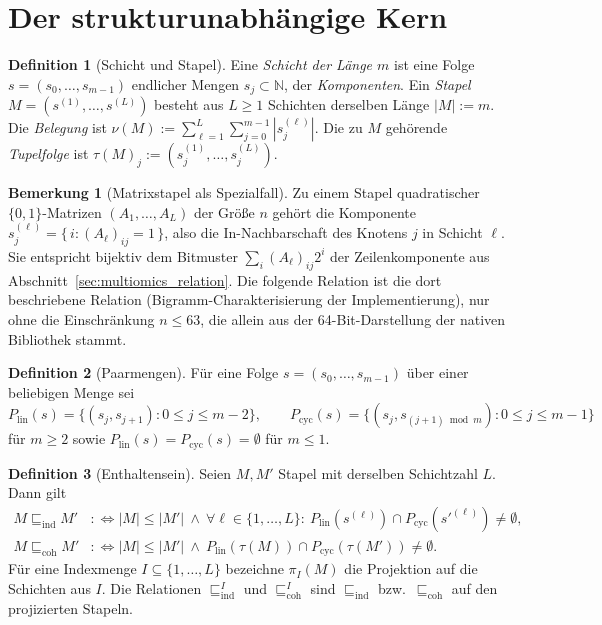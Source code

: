 \documentclass[a4paper,12pt, twoside]{report}
\theoremstyle{definition}
\newtheorem{definition}{Definition}
\newtheorem{bemerkung}{Bemerkung}
\begin{document}
\section{Der strukturunabhängige Kern}
\label{sec:univ_kern}

\begin{definition}[Schicht und Stapel]
	Eine \emph{Schicht der Länge $m$} ist eine Folge $s=(s_0,\dots,s_{m-1})$ endlicher Mengen $s_j\subset\mathbb{N}$, der \emph{Komponenten}. Ein \emph{Stapel} $M=(s^{(1)},\dots,s^{(L)})$ besteht aus $L\ge 1$ Schichten derselben Länge $|M|:=m$. Die \emph{Belegung} ist $\nu(M):=\sum_{\ell=1}^{L}\sum_{j=0}^{m-1}|s^{(\ell)}_j|$. Die zu $M$ gehörende \emph{Tupelfolge} ist $\tau(M)_j:=(s^{(1)}_j,\dots,s^{(L)}_j)$.
\end{definition}

\begin{bemerkung}[Matrixstapel als Spezialfall]
	\label{bem:univ_matrix}
	Zu einem Stapel quadratischer $\{0,1\}$-Matrizen $(A_1,\dots,A_L)$ der Größe $n$ gehört die Komponente $s^{(\ell)}_j=\{\,i : (A_\ell)_{ij}=1\,\}$, also die In-Nachbarschaft des Knotens $j$ in Schicht $\ell$. Sie entspricht bijektiv dem Bitmuster $\sum_i (A_\ell)_{ij}2^i$ der Zeilenkomponente aus Abschnitt~\ref{sec:multiomics_relation}. Die folgende Relation ist die dort beschriebene Relation (Bigramm-Charakterisierung der Implementierung), nur ohne die Einschränkung $n\le 63$, die allein aus der 64-Bit-Darstellung der nativen Bibliothek stammt.
\end{bemerkung}

\begin{definition}[Paarmengen]
	Für eine Folge $s=(s_0,\dots,s_{m-1})$ über einer beliebigen Menge sei
	\[
	P_{\mathrm{lin}}(s)=\{(s_j,s_{j+1}) : 0\le j\le m-2\},\qquad
	P_{\mathrm{cyc}}(s)=\{(s_j,s_{(j+1)\bmod m}) : 0\le j\le m-1\}
	\]
	für $m\ge 2$ sowie $P_{\mathrm{lin}}(s)=P_{\mathrm{cyc}}(s)=\emptyset$ für $m\le 1$.
\end{definition}

\begin{definition}[Enthaltensein]
	Seien $M,M'$ Stapel mit derselben Schichtzahl $L$. Dann gilt
	\begin{align*}
	M\sqsubseteq_{\mathrm{ind}}M' &:\iff |M|\le|M'| \ \wedge\ \forall \ell\in\{1,\dots,L\}:\ P_{\mathrm{lin}}(s^{(\ell)})\cap P_{\mathrm{cyc}}(s'^{(\ell)})\neq\emptyset,\\
	M\sqsubseteq_{\mathrm{coh}}M' &:\iff |M|\le|M'| \ \wedge\ P_{\mathrm{lin}}(\tau(M))\cap P_{\mathrm{cyc}}(\tau(M'))\neq\emptyset.
	\end{align*}
	Für eine Indexmenge $I\subseteq\{1,\dots,L\}$ bezeichne $\pi_I(M)$ die Projektion auf die Schichten aus $I$. Die Relationen $\sqsubseteq_{\mathrm{ind}}^{I}$ und $\sqsubseteq_{\mathrm{coh}}^{I}$ sind $\sqsubseteq_{\mathrm{ind}}$ bzw.\ $\sqsubseteq_{\mathrm{coh}}$ auf den projizierten Stapeln.
\end{definition}
\end{document}
